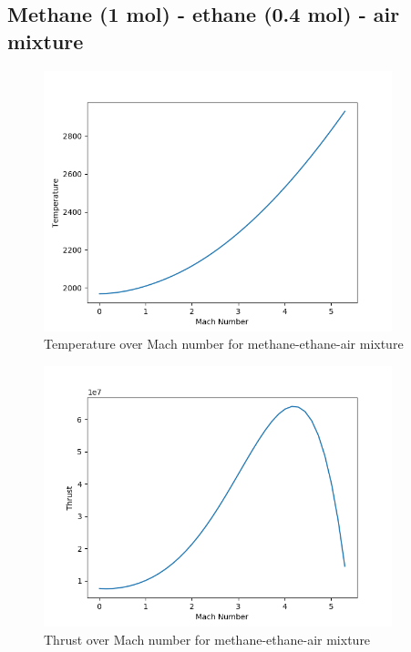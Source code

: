 \documentclass[a4paper,11pt]{article}
\begin{document}
\subsection{Methane (1 mol) - ethane (0.4 mol) - air mixture}
	\begin{figure}[H]
		\centering
       		\includegraphics[width=0.9\textwidth]{metan(1mol)_etan(0.4mol)_pow/Temperature_over_Mach.png}
       		\caption{Temperature over Mach number for methane-ethane-air mixture}
	\end{figure}
	\begin{figure}[H]
		\centering
		\includegraphics[width=0.9\textwidth]{metan(1mol)_etan(0.4mol)_pow/Thrust_over_Mach.png}
       		\caption{Thrust over Mach number for methane-ethane-air mixture}
	\end{figure}
\end{document}
